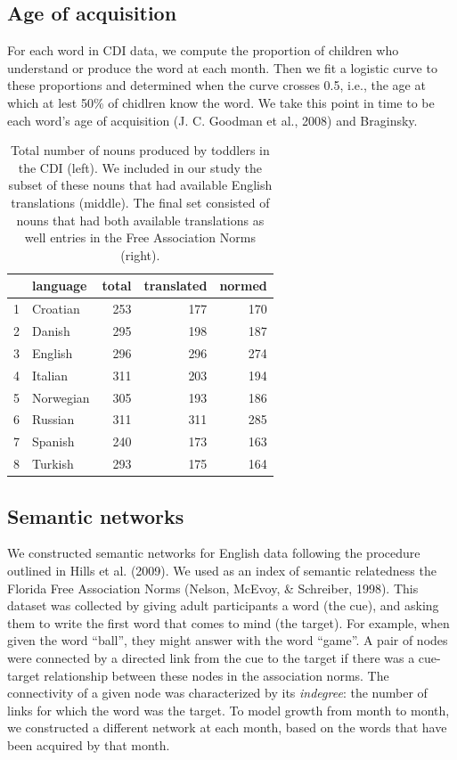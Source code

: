 \documentclass[english,floatsintext,man]{apa6}
\theoremstyle{definition}
\theoremstyle{definition}
\theoremstyle{definition}
\theoremstyle{remark}
\begin{document}
\subsection{Age of acquisition}\label{age-of-acquisition}

For each word in CDI data, we compute the proportion of children who
understand or produce the word at each month. Then we fit a logistic
curve to these proportions and determined when the curve crosses 0.5,
i.e., the age at which at lest 50\% of chidlren know the word. We take
this point in time to be each word's age of acquisition (J. C. Goodman
et al., 2008) and Braginsky.

\begin{table}[H]
\centering
\begin{tabular}{rlrrr}
  \hline
 & language & total & translated & normed \\ 
  \hline
1 & Croatian & 253 & 177 & 170 \\ 
  2 & Danish & 295 & 198 & 187 \\ 
  3 & English & 296 & 296 & 274 \\ 
  4 & Italian & 311 & 203 & 194 \\ 
  5 & Norwegian & 305 & 193 & 186 \\ 
  6 & Russian & 311 & 311 & 285 \\ 
  7 & Spanish & 240 & 173 & 163 \\ 
  8 & Turkish & 293 & 175 & 164 \\ 
   \hline
\end{tabular}
\caption{\label{tab:stats}Total number of nouns produced by toddlers in the CDI (left). We included in our study the subset of these nouns that had available English translations (middle). The final set consisted of nouns that had both available translations as well entries in the Free Association Norms (right).} 
\end{table}

\subsection{Semantic networks}\label{semantic-networks}

We constructed semantic networks for English data following the
procedure outlined in Hills et al. (2009). We used as an index of
semantic relatedness the Florida Free Association Norms (Nelson, McEvoy,
\& Schreiber, 1998). This dataset was collected by giving adult
participants a word (the cue), and asking them to write the first word
that comes to mind (the target). For example, when given the word
\enquote{ball}, they might answer with the word \enquote{game}. A pair
of nodes were connected by a directed link from the cue to the target if
there was a cue-target relationship between these nodes in the
association norms. The connectivity of a given node was characterized by
its \emph{indegree}: the number of links for which the word was the
target. To model growth from month to month, we constructed a different
network at each month, based on the words that have been acquired by
that month.
\end{document}
